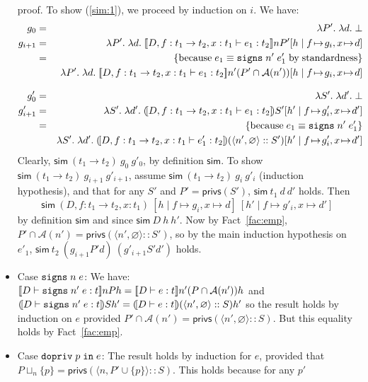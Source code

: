 \documentclass[submission,copyright,creativecommons]{eptcs}
\newcommand{\enable}[2]{\ENABLE\;#1\;\IN\;#2}
\newcommand{\signs}[2]{\SIGNS\;#1\;#2}
\newcommand{\IN}{\mbox{\texttt{in}}}
\newcommand{\A}{\mathcal{A}}
\newcommand{\ldb}{[\![}
\newcommand{\rdb}{]\!]}
\newcommand{\means}[1]{\ldb {#1}\rdb}
\newcommand{\union}{\cup}
\newcommand{\intersect}{\cap}
\newcommand{\proves}{\vdash}
\newcommand{\recext}[5]{[#1\mid#2\!\mapsto\!#3,#4\!\mapsto\!#5]}
\newcommand{\lam}[2]{\lambda #1.\; #2} \newcommand{\all}[2]{\forall #1.\; #2}
\newcommand{\Empty}{\varnothing}
\newcommand{\tuple}[1]{\langle #1 \rangle}
\newcommand{\ENABLE}{\mbox{\texttt{dopriv}}}
\newcommand{\SIGNS}{\mbox{\texttt{signs}}}
\newcommand{\privs}{\textsf{privs}}
\newcommand{\Sim}{\textsf{sim}}
\newcommand{\D}{D} \newcommand{\ty}{t} \renewcommand{\th}{\theta}
\newcommand{\n}{n} \newcommand{\p}{p} \newcommand{\Ps}{\Pi} \newcommand{\h}{h}
\newcommand{\meanss}[1]{(\![ {#1}]\!)}
\newenvironment{xproof}{\begin{trivlist}\item[\hskip\labelsep{\bf  
Proof:}]}{\end{trivlist}}
\begin{document}
\begin{xproof}
\begin{itemize}
proof. To show (\ref{sim:1}), we proceed by induction on $i$. We have:
\begin{eqnarray*}
g_0 &=& 
\lam{P'}{\lam{d}{\bot}}\\
g_{i+1} &=&
\lam{P'}{\lam{d}
             {\means{\D,f:\ty_1\to\ty_2,x:\ty_1\proves e_1:\ty_2}\n P' 
              \recext{\h}{f}{g_i}{x}{d}}}\\
&=&\{\mathrm{because}\; e_1\equiv\signs{\n'}{e'_1}\;\mathrm{by\; standardness} \}\\
& &
\lam{P'}{\lam{d}
             {\means{\D,f:\ty_1\to\ty_2,x:\ty_1\proves e_1:\ty_2}
              \n' (P'\intersect\A(\n'))\recext{\h}{f}{g_i}{x}{d}}}\\[3mm]
g'_0 &=& 
\lam{S'}{\lam{d'}{\bot}}\\
g'_{i+1} &=&
\lam{S'}{\lam{d'}
             {\meanss{\D,f:\ty_1\to\ty_2,x:\ty_1\proves e_1:\ty_2} S'
              \recext{\h'}{f}{g'_i}{x}{d'}}}\\
&=&\{\mathrm{because}\; e_1\equiv\signs{\n'}{e'_1}\}\\
& &\lam{S'}{\lam{d'}
             {\meanss{\D,f:\ty_1\to\ty_2,x:\ty_1\proves e'_1:\ty_2} 
              (\tuple{\n',\Empty}::S')\recext{\h'}{f}{g'_i}{x}{d'}}}
\end{eqnarray*}
Clearly, $\Sim~(\ty_1\to\ty_2)~g_0~g'_0$, by
definition $\Sim$. To show $\Sim~(\ty_1\to\ty_2)~g_{i+1}~g'_{i+1}$, 
assume $\Sim~(\ty_1\to\ty_2)~g_{i}~g'_{i}$ (induction hypothesis), and that
for any $S'$ and $P'=\privs(S')$, $\Sim~\ty_1~d~d'$ holds.
Then \[
\Sim~(\D,f:\ty_1\to\ty_2,x:\ty_1)~\recext{\h}{f}{g_i}{x}{d}~\recext{\h'}{f}{g'_i}{x}{d'}
\]   
by definition $\Sim$ and since $\Sim~D~\h~\h'$. Now by Fact~\ref{fac:emp},
$P'\intersect\A(\n')=\privs(\tuple{\n',\Empty}::S')$, so by the main
induction hypothesis on $e'_1$, 
$\Sim~\ty_2~(g_{i+1}P'd)~(g'_{i+1}S'd')$ holds.
\item 
\begin{sloppypar}
Case $\signs{\n}{e}$:
We have:
$\means{\D\proves\signs{\n'}{e}:\ty}\n P \h =
\means{\D\proves e:\ty}\n'(P\intersect\A(\n')) \h$ and
$\meanss{\D\proves\signs{\n'}{e}:\ty}S \h' =
\meanss{\D\proves e:\ty} (\tuple{\n',\Empty}::S) \h'$
so the result holds by induction on
$e$ provided $P'\intersect\A(\n') = \privs(\tuple{\n',\Empty}::S)$.
But this equality holds by Fact~\ref{fac:emp}.
\end{sloppypar}
\item Case $\enable{\p}{e}$:
The result holds by induction for $e$, provided that
$P\sqcup_{\n}\{\p\} 
= \privs( \tuple{\n,P'\union\{\p\}}::S ) $.  This holds because for any $\p'$

\end{itemize}
\end{xproof}
\end{document}
